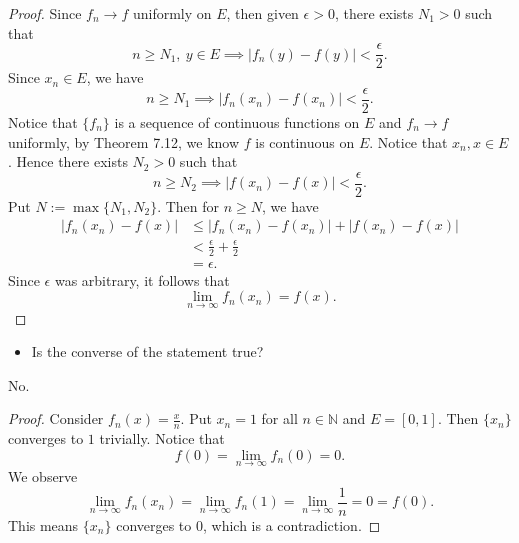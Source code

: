 \begin{Exercise}
	\begin{proof}
		Since $f_n\to f$ uniformly on $E$, then given $\epsilon>0$, there exists $N_1>0$ such that
		$$
		n\geq N_1,\ y\in E \implies |f_n(y) - f(y)| < \frac{\epsilon}{2}.
		$$
		Since $x_n\in E$, we have
		$$
		n\geq N_1 \implies |f_n(x_n) - f(x_n)| < \frac{\epsilon}{2}.
		$$
		Notice that $\{f_n\}$ is a sequence of continuous functions on $E$ and $f_n\to f$ uniformly, by Theorem 7.12, we know $f$ is continuous on $E$.
		Notice that $x_n, x\in E$.
		Hence there exists $N_2 > 0$ such that
		$$
		n\geq N_2 \implies |f(x_n) - f(x)| < \frac{\epsilon}{2}.
		$$
		Put $N := \max\{N_1, N_2\}$.
		Then for $n\geq N$, we have
		\begin{align*}
		|f_n(x_n) - f(x)|
		&\leq |f_n(x_n) - f(x_n)| + |f(x_n) - f(x)| \\
		&< \frac{\epsilon}{2} + \frac{\epsilon}{2} \\
		&= \epsilon.
		\end{align*}
		Since $\epsilon$ was arbitrary, it follows that
		$$
		\lim_{n\to\infty} f_n(x_n) = f(x).
		$$
	\end{proof}
	
	\begin{itemize}
		\item Is the converse of the statement true?
	\end{itemize}
	\begin{answer}
		No.
	\end{answer}
	\begin{proof}
		Consider $f_n(x) = \frac{x}{n}$.
		Put $x_n = 1$ for all $n\in\mathbb{N}$ and $E = [0,1]$.
		Then $\{x_n\}$ converges to $1$ trivially.
		Notice that 
		$$
		f(0) = \lim_{n\to\infty} f_n(0) = 0.
		$$
		We observe
		$$
		\lim_{n\to\infty}f_n(x_n)
		= \lim_{n\to\infty}f_n(1)
		= \lim_{n\to\infty} \frac{1}{n}
		= 0
		= f(0).
		$$
		This means $\{x_n\}$ converges to $0$, which is a contradiction.
	\end{proof}
\end{Exercise}